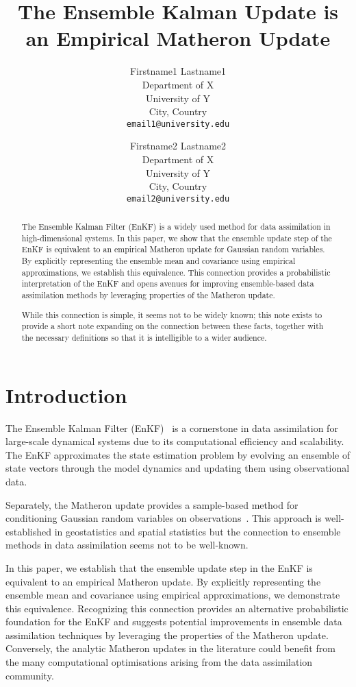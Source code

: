 \documentclass{article}
\title{The Ensemble Kalman Update is an Empirical Matheron Update}
\author{
  Firstname1 Lastname1 \\
  Department of X \\
  University of Y \\
  City, Country \\
  \texttt{email1@university.edu} \\
  \and
  Firstname2 Lastname2 \\
  Department of X \\
  University of Y \\
  City, Country \\
  \texttt{email2@university.edu} \\
}
\date{}
\begin{document}
\begin{abstract}
The Ensemble Kalman Filter (EnKF) is a widely used method for data assimilation in high-dimensional systems. In this paper, we show that the ensemble update step of the EnKF is equivalent to an empirical Matheron update for Gaussian random variables. By explicitly representing the ensemble mean and covariance using empirical approximations, we establish this equivalence. This connection provides a probabilistic interpretation of the EnKF and opens avenues for improving ensemble-based data assimilation methods by leveraging properties of the Matheron update.

While this connection is simple, it seems not to be widely known; this note exists to provide a short note expanding on the connection between these facts, together with the necessary definitions so that it is intelligible to a wider audience.
\end{abstract}

\section{Introduction}
The Ensemble Kalman Filter (EnKF)~\citep{Evensen2003Ensemble,Evensen2009Data} is a cornerstone in data assimilation for large-scale dynamical systems due to its computational efficiency and scalability.
The EnKF approximates the state estimation problem by evolving an ensemble of state vectors through the model dynamics and updating them using observational data.

Separately, the Matheron update provides a sample-based method for conditioning Gaussian random variables on observations~\citep{Doucet2010Note,Wilson2020Efficiently,Wilson2021Pathwise}.
This approach is well-established in geostatistics and spatial statistics but the connection to ensemble methods in data assimilation seems not to be well-known.

In this paper, we establish that the ensemble update step in the EnKF is equivalent to an empirical Matheron update.
By explicitly representing the ensemble mean and covariance using empirical approximations, we demonstrate this equivalence.
Recognizing this connection provides an alternative  probabilistic foundation for the EnKF and suggests potential improvements in ensemble data assimilation techniques by leveraging the properties of the Matheron update.
Conversely, the analytic Matheron updates in the literature could benefit from the many computational optimisations arising from the data assimilation community.
\end{document}
